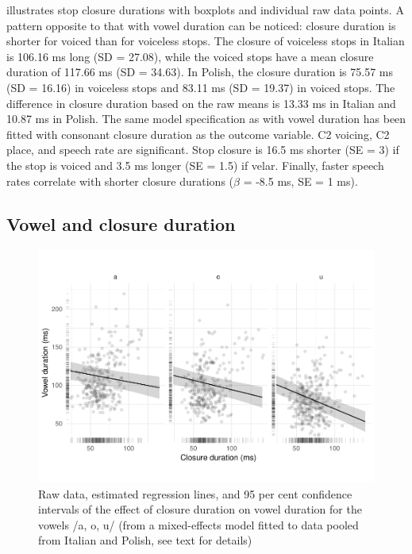 \documentclass[charis]{glossa}
\begin{document}
 illustrates stop closure durations with boxplots and
individual raw data points. A pattern opposite to that with vowel
duration can be noticed: closure duration is shorter for voiced than for
voiceless stops. The closure of voiceless stops in Italian is 106.16 ms
long (SD = 27.08), while the voiced stops have a mean closure duration
of 117.66 ms (SD = 34.63). In Polish, the closure duration is 75.57 ms
(SD = 16.16) in voiceless stops and 83.11 ms (SD = 19.37) in voiced
stops. The difference in closure duration based on the raw means is
13.33 ms in Italian and 10.87 ms in Polish. The same model specification
as with vowel duration has been fitted with consonant closure duration
as the outcome variable. C2 voicing, C2 place, and speech rate are
significant. Stop closure is 16.5 ms shorter (SE = 3) if the stop is
voiced and 3.5 ms longer (SE = 1.5) if velar. Finally, faster speech
rates correlate with shorter closure durations (\(\hat{\beta}\) = -8.5
ms, SE = 1 ms).

\hypertarget{vowel-and-closure-duration}{%
\subsection{Vowel and closure
duration}\label{vowel-and-closure-duration}}

\label{s:vcduration}

\begin{figure}
\includegraphics[width=\linewidth]{2018-relrel_files/figure-latex/Figure4} \caption{Raw data, estimated regression lines, and 95 per cent confidence intervals of the effect of closure duration on vowel duration for the vowels /a, o, u/ (from a mixed-effects model fitted to data pooled from Italian and Polish, see text for details)}\label{f:Figure4}
\end{figure}
\end{document}
